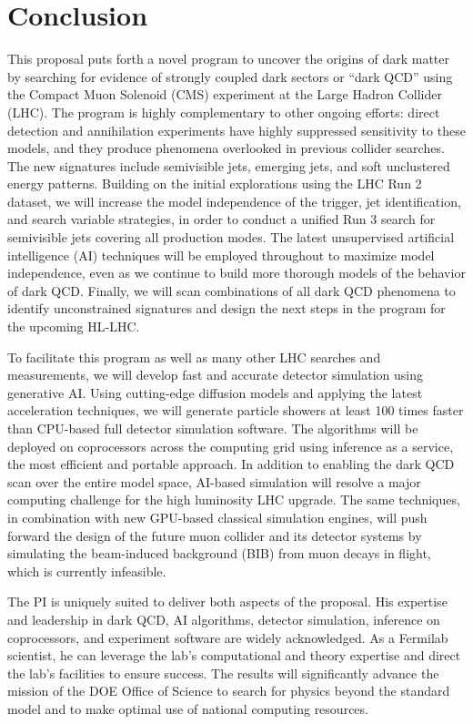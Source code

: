 \section{Conclusion}\label{sec:conclusion}

This proposal puts forth a novel program to uncover the origins of dark matter
by searching for evidence of strongly coupled dark sectors or ``dark QCD''
using the Compact Muon Solenoid (CMS) experiment at the Large Hadron Collider (LHC).
The program is highly complementary to other ongoing efforts:
direct detection and annihilation experiments have highly suppressed sensitivity to these models,
and they produce phenomena overlooked in previous collider searches.
The new signatures include semivisible jets, emerging jets, and soft unclustered energy patterns.
Building on the initial explorations using the LHC Run 2 dataset,
we will increase the model independence of the trigger, jet identification, and search variable strategies,
in order to conduct a unified Run 3 search for semivisible jets covering all production modes.
The latest unsupervised artificial intelligence (AI) techniques will be employed throughout to maximize model independence,
even as we continue to build more thorough models of the behavior of dark QCD.
Finally, we will scan combinations of all dark QCD phenomena to identify unconstrained signatures
and design the next steps in the program for the upcoming HL-LHC.

To facilitate this program as well as many other LHC searches and measurements,
we will develop fast and accurate detector simulation using generative AI.
Using cutting-edge diffusion models and applying the latest acceleration techniques,
we will generate particle showers at least 100 times faster than CPU-based full detector simulation software.
The algorithms will be deployed on coprocessors across the computing grid using inference as a service,
the most efficient and portable approach.
In addition to enabling the dark QCD scan over the entire model space,
AI-based simulation will resolve a major computing challenge for the high luminosity LHC upgrade.
The same techniques, in combination with new GPU-based classical simulation engines,
will push forward the design of the future muon collider and its detector systems
by simulating the beam-induced background (BIB) from muon decays in flight, which is currently infeasible.

The PI is uniquely suited to deliver both aspects of the proposal.
His expertise and leadership in dark QCD, AI algorithms, detector simulation, inference on coprocessors, and experiment software are widely acknowledged.
As a Fermilab scientist, he can leverage the lab's computational and theory expertise and direct the lab's facilities to ensure success.
The results will significantly advance the mission of the DOE Office of Science to search for physics beyond the standard model and to make optimal use of national computing resources.

